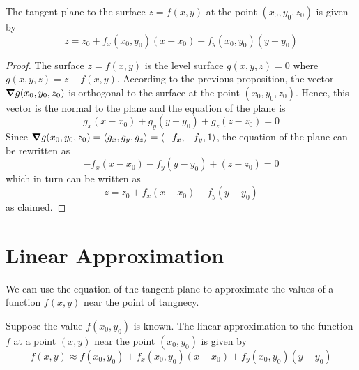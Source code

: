 \documentclass[handout]{ximera}
\begin{document}
\begin{theorem}
The tangent plane to the surface $z = f(x,y)$ at the point $(x_0, y_0, z_0)$ is given by
\[
z = z_0 + f_x(x_0, y_0)(x - x_0) + f_y(x_0, y_0)(y - y_0)
\]
\end{theorem}
\begin{proof}
The surface $z = f(x,y)$ is the level surface $g(x,y,z) = 0$ where $g(x,y,z) = z - f(x,y)$.
According to the previous proposition, the vector $\boldsymbol\nabla g(x_0, y_0, z_0)$ is orthogonal to the surface at the point $(x_0, y_0, z_0)$.
Hence, this vector is the normal to the plane and the equation of the plane is
\[
g_x(x - x_0) + g_y(y-y_0) + g_z(z -z_0) = 0
\]
Since $\boldsymbol\nabla g(x_0, y_0, z_0) = \left\langle g_x, g_y, g_z\right\rangle = \left\langle -f_x, -f_y, 1\right\rangle$, the equation of the plane can be rewritten as
\[
-f_x(x-x_0) - f_y(y-y_0) + (z-z_0) = 0
\]
which in turn can be written as
\[
z = z_0 + f_x(x-x_0) + f_y(y-y_0)
\]
as claimed.
\end{proof}


\section{Linear Approximation}
We can use the equation of the tangent plane to approximate the values of a function $f(x,y)$ near the point of tangnecy.

Suppose the value $f(x_0, y_0)$ is known. The linear approximation to the function $f$ at a point $(x,y)$ near the point $(x_0, y_0)$
is given by
\[
f(x,y) \approx f(x_0, y_0) + f_x(x_0, y_0)(x-x_0) + f_y(x_0, y_0)(y-y_0)
\]
\end{document}
